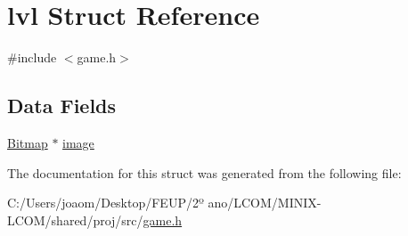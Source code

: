 \hypertarget{structlvl}{}\section{lvl Struct Reference}
\label{structlvl}


{\ttfamily \#include $<$game.\+h$>$}

\subsection*{Data Fields}
\begin{DoxyCompactItemize}
\item 
\mbox{\hyperlink{struct_bitmap}{Bitmap}} $\ast$ \mbox{\hyperlink{group__game_ga801bef0ab9d72c95bc5d6d6a0d8f2db0}{image}}
\end{DoxyCompactItemize}


The documentation for this struct was generated from the following file\+:\begin{DoxyCompactItemize}
\item 
C\+:/\+Users/joaom/\+Desktop/\+F\+E\+U\+P/2º ano/\+L\+C\+O\+M/\+M\+I\+N\+I\+X-\/\+L\+C\+O\+M/shared/proj/src/\mbox{\hyperlink{game_8h}{game.\+h}}\end{DoxyCompactItemize}
